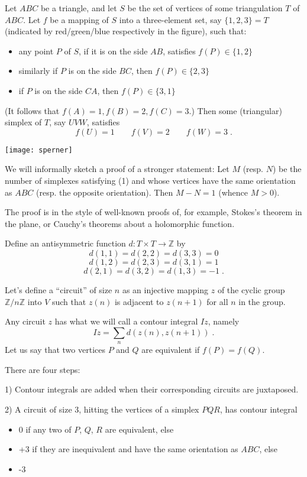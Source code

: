 \documentclass[12pt]{article}
\newcommand{\Z}{\mathbb{Z}}
\begin{document}
 
 
 
 
Let $ABC$ be a triangle, and let $S$ be the set of vertices of some
triangulation $T$ of $ABC$. Let $f$ be a mapping
of $S$ into a three-element set, say $\{1,2,3\}=T$ (indicated by
red/green/blue respectively in the figure), such that:
\begin{itemize}
\item
any point $P$ of $S$, if it is on the side $AB$, satisfies
$f(P)\in\{1,2\}$
\item
similarly if $P$ is on the side $BC$, then $f(P)\in\{2,3\}$
\item
if $P$ is on the side $CA$, then $f(P)\in\{3,1\}$
\end{itemize}
(It follows that $f(A)=1, f(B)=2, f(C)=3$.)
Then some (triangular) simplex of $T$, say $UVW$, satisfies
$$f(U)=1 \qquad f(V)=2 \qquad f(W)=3\;.$$

\begin{center}
\texttt{[image: sperner]}
\end{center}

We will informally sketch a proof of a stronger statement:
Let $M$ (resp. $N$) be the number of simplexes satisfying (1) and whose
vertices have the same orientation as $ABC$ (resp. the
opposite orientation). Then $M-N=1$ (whence $M>0$).

The proof is in the style of well-known proofs of, for example, Stokes's
theorem in the plane, or Cauchy's theorems about a holomorphic function.

Define an antisymmetric function $d:T\times T\to\mathbb{Z}$ by
$$d(1,1)=d(2,2)=d(3,3)=0$$
$$d(1,2)=d(2,3)=d(3,1)=1$$
$$d(2,1)=d(3,2)=d(1,3)=-1\;.$$

Let's define a ``circuit'' of size $n$ as an injective mapping $z$ of the
cyclic group $\Z/n\Z$ into $V$ such that $z(n)$ is adjacent to $z(n+1)$
for all $n$ in the group.

Any circuit $z$ has what we will call a contour integral $Iz$, namely
$$Iz=\sum_n d(z(n),z(n+1))\;.$$
Let us say that two vertices $P$ and $Q$ are equivalent if $f(P)=f(Q)$.

There are four steps:

1) Contour integrals are added when their corresponding circuits are juxtaposed.

2) A circuit of size 3, hitting the vertices of a simplex $PQR$, has contour integral
\begin{itemize}
\item 0 if any two of $P$, $Q$, $R$ are equivalent, else
\item +3 if they are inequivalent and have the same orientation as $ABC$, else
\item -3
\end{itemize}
\end{document}
